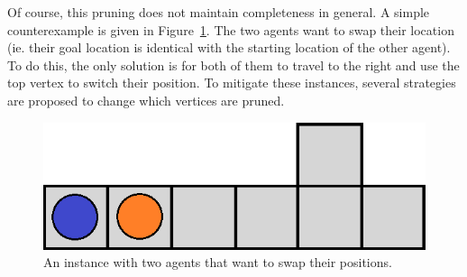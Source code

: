 %
%

Of course, this pruning does not maintain completeness in general. A simple counterexample is given in Figure~\ref{fig:m_counterexample}. The two agents want to swap their location (ie. their goal location is identical with the starting location of the other agent). To do this, the only solution is for both of them to travel to the right and use the top vertex to switch their position. %
To mitigate these instances, several strategies are proposed to change which vertices are pruned.
%
\begin{figure}[ht]
\centering
\includegraphics[width=0.45\columnwidth]{img/m_counterexample.png}
\caption{An instance with two agents that want to swap their positions.}
\label{fig:m_counterexample}
\end{figure}
%


